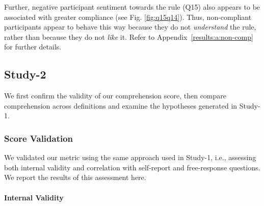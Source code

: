 \documentclass{article}
\newcommand{\studyA}{Study-1}
\newcommand{\studyB}{Study-2}
\newcommand{\Appref}[1]{Appendix~\ref{#1}}
\begin{document}
Further, negative participant sentiment towards the rule (Q15) also appears to be associated with greater compliance (see Fig. \ref{fig:q15q14}). Thus, non-compliant participants appear to behave this way because they do not \emph{understand} the rule, rather than because they do not \emph{like} it. Refer to \Appref{results:a:non-comp} for further details.















\subsection{\studyB{}} \label{results:b}
We first confirm the validity of our 
comprehension score, then compare comprehension across 
definitions and examine the hypotheses generated in \studyA{}.

\subsubsection{Score Validation} \label{results:b:validation}

We validated our metric using the same approach used in \studyA{}, i.e., assessing both internal validity and correlation with self-report and free-response questions. We report the results of this assessment here.

\paragraph{Internal Validity}
\end{document}

